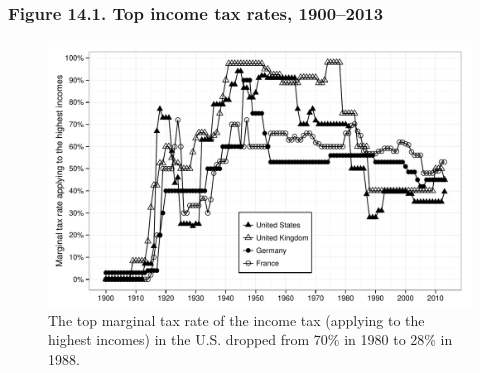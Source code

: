 \documentclass[t]{beamer}\usepackage[]{graphicx}\usepackage[]{color}
\newenvironment{knitrout}{}{} %
\begin{document}
\begin{frame}[label=Figure_14_1]
\frametitle{Figure 14.1. Top income tax rates, 1900--2013}
\begin{figure}[t]
\begin{minipage}[b]{\textwidth}
\centering
\begin{knitrout}\footnotesize
{}\color{fgcolor}

{\centering \includegraphics[width=1\linewidth]{figures/bw/Figure_14_1} 

}



\end{knitrout}
\caption{The top marginal tax rate of the income tax (applying to the highest incomes) in the U.S. dropped from 70\% in 1980 to 28\% in 1988.}
\end{minipage}
\end{figure}
\end{frame}
\end{document}
